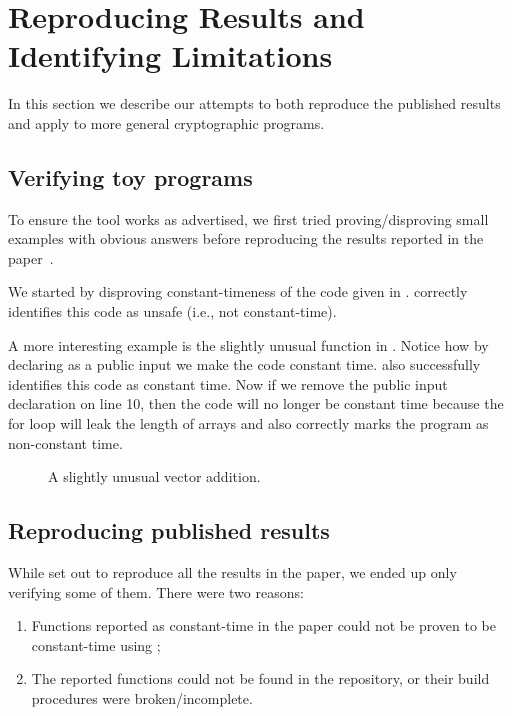 \section{Reproducing Results and Identifying Limitations}
\label{sec:reproducing-results}

In this section we describe our attempts to both reproduce the published results and apply \ctVerif to more general cryptographic programs. 

\subsection{Verifying toy programs}

To ensure the tool works as advertised, we first tried proving/disproving small examples with obvious answers before reproducing the
results reported in the paper~\cite{almeida}.

We started by disproving constant-timeness of the code given in .
\ctVerif correctly identifies this code as unsafe (i.e., not constant-time).

A more interesting example is the slightly unusual 
function in . Notice how by declaring  as
a public input we make the code constant time. \ctVerif also successfully
identifies this code as constant time. Now if we remove the public input
declaration on line 10, then the code will no longer be constant time because the
for loop will leak the length of arrays and \ctVerif also correctly marks the
program as non-constant time.

\begin{figure}[h]
    \centering\resizebox{0.7\columnwidth}{!}{}
    \caption{A slightly unusual vector addition.}
    \label{fig:vector_add}
\end{figure}


\subsection{Reproducing published results}

While set out to reproduce all the results in the paper, we ended up
only verifying some of them. There were two reasons:
\begin{enumerate}
    \item Functions reported as constant-time in the paper could not be proven
    to be constant-time using \ctVerif;
    \item The reported functions could not be found in the \ctVerif repository,
    or their build procedures were broken/incomplete.
\end{enumerate}

